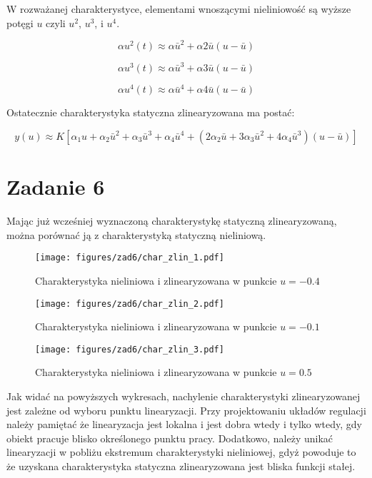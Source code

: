 \documentclass[a4paper,titlepage,11pt,floatssmall]{mwrep}
\begin{document}
W rozważanej charakterystyce, elementami wnoszącymi nieliniowość są wyższe potęgi $u$ czyli $u^2$, $u^3$, i $u^4$.

\begin{equation*}
\alpha u^2(t) \approx \alpha \bar{u}^2 + \alpha 2\bar{u} (u - \bar{u})
\end{equation*}

\begin{equation*}
\alpha u^3(t) \approx \alpha \bar{u}^3 + \alpha 3\bar{u} (u - \bar{u})
\end{equation*}

\begin{equation*}
\alpha u^4(t) \approx \alpha \bar{u}^4 + \alpha 4\bar{u} (u - \bar{u})
\end{equation*}

Ostatecznie charakterystyka statyczna zlinearyzowana ma postać:

\begin{equation*}
y(u) \approx K[\alpha_1 u + \alpha_2 \bar{u}^2 + \alpha_3 \bar{u}^3 + \alpha_4 \bar{u}^4 + (2\alpha_2 \bar{u} + 3\alpha_3 \bar{u}^2 + 4\alpha_4 \bar{u}^3) (u - \bar{u})]
\end{equation*}
 
\section{Zadanie 6}
\indent{} Mając już wcześniej wyznaczoną charakterystykę statyczną zlinearyzowaną, można porównać ją z charakterystyką statyczną nieliniową. 

\begin{figure}[H]
\centering
\texttt{[image: figures/zad6/char\_zlin\_1.pdf]}
\caption{Charakterystyka nieliniowa i zlinearyzowana w punkcie $u = -0.4$}
\end{figure}

\begin{figure}[H]
\centering
\texttt{[image: figures/zad6/char\_zlin\_2.pdf]}
\caption{Charakterystyka nieliniowa i zlinearyzowana w punkcie $u = -0.1$}
\end{figure}

\begin{figure}[H]
\centering
\texttt{[image: figures/zad6/char\_zlin\_3.pdf]}
\caption{Charakterystyka nieliniowa i zlinearyzowana w punkcie $u = 0.5$}
\end{figure}
\newpage
Jak widać na powyższych wykresach, nachylenie charakterystyki zlinearyzowanej jest zależne od wyboru punktu linearyzacji. Przy projektowaniu układów regulacji należy pamiętać że linearyzacja jest lokalna i jest dobra wtedy i tylko wtedy, gdy obiekt pracuje blisko określonego punktu pracy. Dodatkowo, należy unikać linearyzacji w pobliżu ekstremum charakterystyki nieliniowej, gdyż powoduje to że uzyskana charakterystyka statyczna zlinearyzowana jest bliska funkcji stałej.
\end{document}
